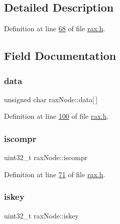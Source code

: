 \subsection{Detailed Description}


Definition at line \hyperlink{rax_8h_source_l00068}{68} of file \hyperlink{rax_8h_source}{rax.\+h}.



\subsection{Field Documentation}
\mbox{\label{structraxNode_a1a15402433f80b23310c4a11396b3fda}} 
\subsubsection{\texorpdfstring{data}{data}}
{\footnotesize\ttfamily unsigned char rax\+Node\+::data\mbox{[}$\,$\mbox{]}}



Definition at line \hyperlink{rax_8h_source_l00100}{100} of file \hyperlink{rax_8h_source}{rax.\+h}.

\mbox{\label{structraxNode_acc78828f83997d2e4466fcd83c151ea4}} 
\subsubsection{\texorpdfstring{iscompr}{iscompr}}
{\footnotesize\ttfamily uint32\+\_\+t rax\+Node\+::iscompr}



Definition at line \hyperlink{rax_8h_source_l00071}{71} of file \hyperlink{rax_8h_source}{rax.\+h}.

\mbox{\label{structraxNode_a868f1a97afbb0adb2a54614055ad37b6}} 
\subsubsection{\texorpdfstring{iskey}{iskey}}
{\footnotesize\ttfamily uint32\+\_\+t rax\+Node\+::iskey}



